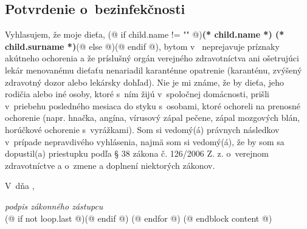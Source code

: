             \subsection{Potvrdenie o~bezinfekčnosti}
                Vyhlasujem, že moje dieťa,
                (@ if child.name != "" @)\textbf{(* child.name *) (* child.surname *)}(@ else @)\makebox[30mm]{\dotfill}(@ endif @),
                bytom v~\makebox[30mm]{\dotfill} neprejavuje príznaky akútneho ochorenia a že
                príslušný orgán verejného zdravotníctva ani ošetrujúci lekár menovanému dieťaťu nenariadil
                karanténne opatrenie (karanténu, zvýšený zdravotný dozor alebo lekársky dohľad). Nie je mi známe, že
                by dieťa, jeho rodičia alebo iné osoby, ktoré s~ním žijú v~spoločnej domácnosti, prišli v~priebehu
                posledného mesiaca do styku s~osobami, ktoré ochoreli na prenosné ochorenie (napr. hnačka, angína,
                vírusový zápal pečene, zápal mozgových blán, horúčkové ochorenie s~vyrážkami). Som si
                vedomý(á) právnych následkov v~prípade nepravdivého vyhlásenia, najmä som si vedomý(á), že by som sa
                dopustil(a) priestupku podľa § 38 zákona č. 126/2006 Z. z. o~verejnom zdravotníctve a o~zmene a
                doplnení niektorých zákonov.
                \vspace{5mm}

                V~\dotfill dňa \dotfill, \hfill \makebox[46mm]{\dotfill}

                \vspace*{-8pt}
                \hfill \textit{podpis zákonného zástupcu} \\[5mm]
            (@ if not loop.last @)\newpage(@ endif @)
    (@ endfor @)
(@ endblock content @)
